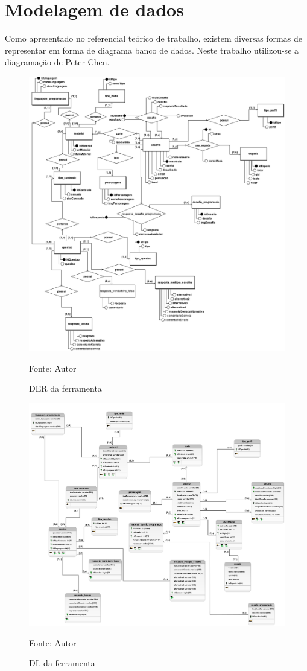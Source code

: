 \section{Modelagem de dados}
Como apresentado no referencial teórico de trabalho, existem diversas formas de representar em forma de diagrama banco de dados. Neste trabalho utilizou-se a diagramação de Peter Chen.
\begin{figure}[h]
	\centering
	\includegraphics[keepaspectratio=true,scale=0.4]{figuras/der.png}
	\caption{DER da ferramenta}
	Fonte: Autor
	\label{figura2}
\end{figure}
\pagebreak

\begin{figure}[h]
	\centering
	\includegraphics[keepaspectratio=true,scale=0.32]{figuras/dl.png}
	\caption{DL da ferramenta}
	Fonte: Autor
	\label{figura3}
\end{figure}

